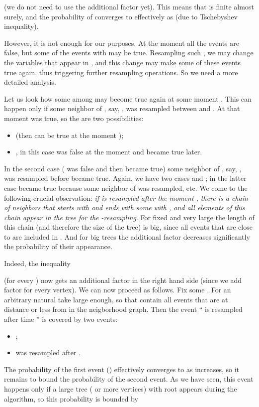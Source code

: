 \documentclass[12pt]{article}
\begin{document}
(we do not need to use the additional factor  yet). This means that  is finite almost surely, and the probability of  converges to  effectively as  (due to Tschebyshev inequality).

However, it is not enough for our purposes. At the moment  all the events  are false, but some of the events  with  may be true. Resampling such , we may change the variables that appear in , and this change may make some of these events true again, thus triggering further resampling operations. So we need a more detailed analysis.

Let us look how some  among  may become true again at some moment . This can happen only if some neighbor of , say, , was resampled between  and . At that moment  was true, so the are two possibilities:
\begin{itemize}
\item  (then  can be true at the moment );
\item , in this case  was false at the moment  and became true later.
\end{itemize}
In the second case ( was false and then became true) some neighbor of , say, , was resampled before  became true. Again, we have two cases  and ; in the latter case  became true because some neighbor  of  was resampled, etc. We come to the following crucial observation: \emph{if  is resampled after the moment , there is a chain of neighbors that starts with  and ends with some  with , and all elements of this chain appear in the tree for the -resampling}. For fixed  and very large  the length of this chain (and therefore the size of the tree) is big, since all events that are close to  are included in . And for big trees the additional factor  decreases significantly the probability of their appearance.

Indeed, the inequality

 (for every ) now gets an additional factor  in the right hand side (since we add factor  for every vertex). We can now proceed as follows. Fix some . For an arbitrary natural  take  large enough, so that  contain all events that are at distance  or less from  in the neigborhood graph. Then the event `` is resampled after time '' is covered by two events:

\begin{itemize}
\item ;
\item  was resampled after .
\end{itemize}

The probability of the first event () effectively converges to  as  increases, so it remains to bound the probability of the second event. As we have seen, this event happens only if a large tree ( or more vertices) with root  appears during the algorithm, so this probability is bounded by
 
\end{document}
